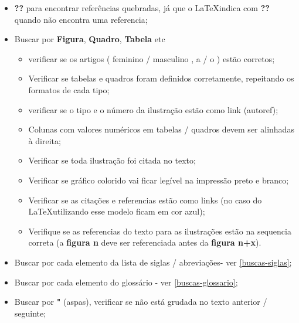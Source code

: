 \begin{itemize}
    \item \textbf{??} para encontrar referências quebradas, já que o \LaTeX \space indica com \textbf{??} quando não encontra uma referencia;
    
    \item Buscar por \textbf{Figura}, \textbf{Quadro}, \textbf{Tabela} etc
    
        \begin{itemize}
            \item verificar se os artigos ( feminino / masculino ,  a / o  ) estão corretos;
           
            \item Verificar se tabelas e quadros foram definidos corretamente, repeitando os formatos de cada tipo;
            
            \item verificar se o tipo e o número da ilustração estão como link (autoref);
           
            \item Colunas com valores numéricos em tabelas / quadros devem ser alinhadas à direita;
           
            \item Verificar se toda ilustração foi citada no texto;
           
            \item Verificar se gráfico colorido vai ficar legível na impressão preto e branco;
            
            \item Verificar se as citações e referencias estão como links (no caso do \LaTeX \space utilizando esse modelo ficam em cor azul);
          
            \item Verifique se as referencias do texto para as ilustrações estão na sequencia correta (a \textbf{figura n} deve ser referenciada antes da \textbf{figura n+x}).  
        \end{itemize}
        
    \item Buscar por cada elemento da lista de siglas / abreviações- ver \autoref{buscas-siglas};
    
    \item Buscar por cada elemento do glossário - ver \autoref{buscas-glossario};
            
    \item Buscar por \textbf{"} (aspas), verificar se não está grudada no texto anterior / seguinte;
    

\end{itemize}
